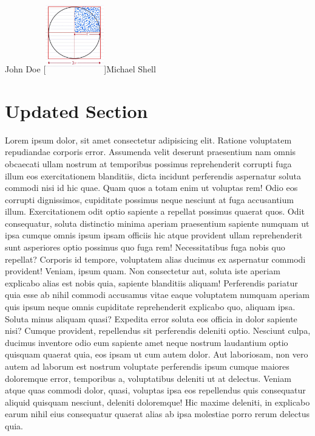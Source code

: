 \documentclass[journal,lettersize]{IEEEtran}%
\begin{document}
%
\begin{IEEEbiographynophoto}{John Doe}%
[{\includegraphics[width=1in,height=1.25in,clip,keepaspectratio]{image_5}}]{Michael Shell}%
\appendices%
\section{Updated Section}%
\label{sec:UpdatedSection}%
Lorem ipsum dolor, sit amet consectetur adipisicing elit. Ratione voluptatem repudiandae corporis error. Assumenda velit deserunt praesentium nam omnis obcaecati ullam nostrum at temporibus possimus reprehenderit corrupti fuga illum eos exercitationem blanditiis, dicta incidunt perferendis aspernatur soluta commodi nisi id hic quae. Quam quos a totam enim ut voluptas rem! Odio eos corrupti dignissimos, cupiditate possimus neque nesciunt at fuga accusantium illum. Exercitationem odit optio sapiente a repellat possimus quaerat quos. Odit consequatur, soluta distinctio minima aperiam praesentium sapiente numquam ut ipsa cumque omnis ipsum ipsam officiis hic atque provident ullam reprehenderit sunt asperiores optio possimus quo fuga rem! Necessitatibus fuga nobis quo repellat? Corporis id tempore, voluptatem alias ducimus ex aspernatur commodi provident! Veniam, ipsum quam. Non consectetur aut, soluta iste aperiam explicabo alias est nobis quia, sapiente blanditiis aliquam! Perferendis pariatur quia esse ab nihil commodi accusamus vitae eaque voluptatem numquam aperiam quis ipsum neque omnis cupiditate reprehenderit explicabo quo, aliquam ipsa. Soluta minus aliquam quasi? Expedita error soluta eos officia in dolor sapiente nisi? Cumque provident, repellendus sit perferendis deleniti optio. Nesciunt culpa, ducimus inventore odio eum sapiente amet neque nostrum laudantium optio quisquam quaerat quia, eos ipsam ut cum autem dolor. Aut laboriosam, non vero autem ad laborum est nostrum voluptate perferendis ipsum cumque maiores doloremque error, temporibus a, voluptatibus deleniti ut at delectus. Veniam atque quas commodi dolor, quasi, voluptas ipsa eos repellendus quis consequatur aliquid quisquam nesciunt, deleniti doloremque! Hic maxime deleniti, in explicabo earum nihil eius consequatur quaerat alias ab ipsa molestiae porro rerum delectus quia.


\end{IEEEbiographynophoto}
\end{document}
